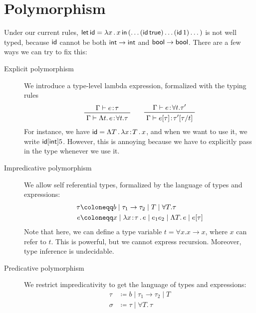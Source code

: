 \documentclass[class=scrartcl]{standalone}
\begin{document}
\section{Polymorphism}
Under our current rules,
\(\operatorname{\textsf{let}}{\operatorname{\textsf{id}} = \lambda{x}\operatorname{.}{x}}\operatorname{\textsf{in}}{(\dots (\operatorname{\textsf{id}} \textsf{true}) \dots (\operatorname{\textsf{id}} 1) \dots)}\)
is not well typed, because \(\operatorname{\textsf{id}}\) cannot be both
\(\textsf{int} \to \textsf{int}\) and \(\textsf{bool} \to \textsf{bool}\).
There are a few ways we can try to fix this:
\begin{description}
  \item [Explicit polymorphism] We introduce a type-level lambda expression,
        formalized with the typing rules
        \[
          \prftree{\Gamma \vdash e \of \tau}
                  {\Gamma \vdash \Lambda t.\, e
                                 \of \forall t. \tau} \qquad
          \prftree{\Gamma \vdash e \of \forall t. \tau'}
                  {\Gamma \vdash e[\tau] \of \tau'[\tau / t]}
        \]
        For instance, we have \(\operatorname{\textsf{id}} = \Lambda T \operatorname{.}
                                                     \lambda{x {\hspace{0.1111em}:\hspace{0.1111em}}T}\operatorname{.}{x}\),
        and when we want to use it, we write \(\operatorname{\textsf{id}}[\textsf{int}]5\).
        However, this is annoying because we have to explicitly
        pass in the type whenever we use it.
  \item [Impredicative polymorphism] We allow self referential types,
        formalized by the language of types and expressions:
        \begin{align*}
          \tau &\coloneqq b \mid \tau_1 \to \tau_2
                            \mid T
                            \mid \forall T. \tau \\
          e    &\coloneqq x \mid \plambda{x \of \tau}{e}
                            \mid e_1 e_2
                            \mid \Lambda T.\, e
                            \mid e[\tau]
        \end{align*}
        Note that here, we can define
        a type variable \(t = \forall x. x \to x\),
        where \(x\) can refer to \(t\).
        This is powerful, but we cannot express recursion.
        Moreover, type inference is undecidable.
  \item [Predicative polymorphism] We restrict impredicativity to get
        the language of types and expressions:
        \begin{align*}
          \tau   &\coloneqq b \mid \tau_1 \to \tau_2
                              \mid T \\
          \sigma &\coloneqq \tau \mid \forall T .\, \tau

\end{align*}
\end{description}
\end{document}
